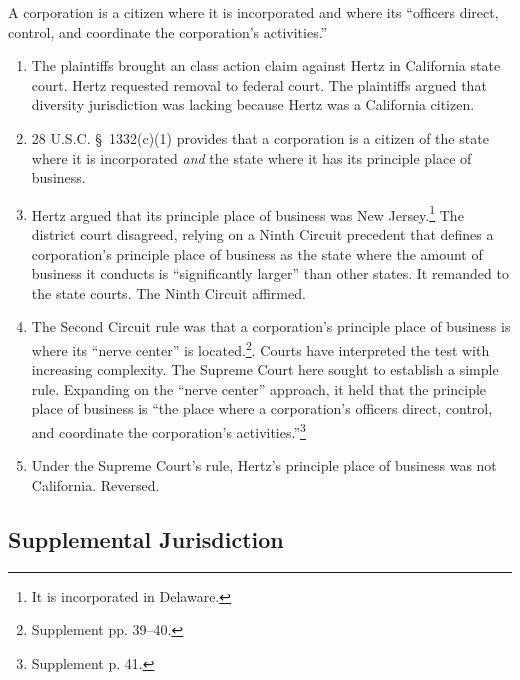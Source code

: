 A corporation is a citizen where it is incorporated and where its ``officers 
direct, control, and coordinate the corporation's activities.''

\begin{enumerate}
    \item The plaintiffs brought an class action claim against Hertz in 
    California state court. Hertz requested removal to federal court. The 
    plaintiffs argued that diversity jurisdiction was lacking because Hertz 
    was a California citizen.
    \item 28 U.S.C. \S\ 1332(c)(1) provides that a corporation is a citizen of 
    the state where it is incorporated \emph{and} the state where it has its 
    principle place of business.
    \item Hertz argued that its principle place of business was New 
    Jersey.\footnote{It is incorporated in Delaware.} The district court 
    disagreed, relying on a Ninth Circuit precedent that defines a 
    corporation's principle place of business as the state where the amount of 
    business it conducts is ``significantly larger'' than other states. It 
    remanded to the state courts. The Ninth Circuit affirmed.
    \item The Second Circuit rule was that a corporation's principle place of 
    business is where its ``nerve center'' is located.\footnote{Supplement pp.  
    39--40.}. Courts have interpreted the test with increasing complexity. The 
    Supreme Court here sought to establish a simple rule. Expanding on the 
    ``nerve center'' approach, it held that the principle place of business is 
    ``the place where a corporation's officers direct, control, and coordinate 
    the corporation's activities.''\footnote{Supplement p. 41.}
    \item Under the Supreme Court's rule, Hertz's principle place of business 
    was not California. Reversed.
\end{enumerate}

\subsection{Supplemental Jurisdiction}

